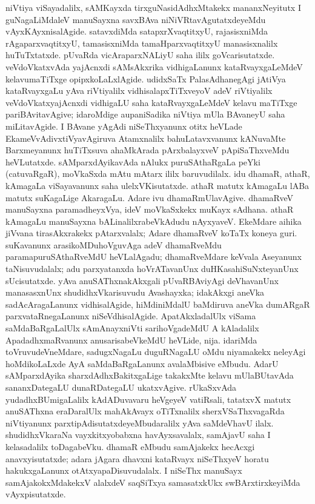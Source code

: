 niVtiya viSayadalilx, sAMKayxda tirxguNasidAdhxMtakekx mananxNeyitutx I guNa\-gaLiMdaleV manuSayxna savxBAva niNiVRtavAgutatxdeyeMdu vAyxKAyxnisalAgide. satavxdiMda satapxrXvaq\-titxyU, rajasisxniMda rAgaparxvaqtitxyU, tamasisxniMda tamaHparxvaqtitxyU manasisxnalilx huTuTx\-tatxde. pUvaRda vicAraparxNALiyU saha ililx goVcarisutatxde. veVdoVkatxvAda yajAcnxdi sAMsAkxrika vidhigaLanunx kataRvayxgaLeMdeV kelavumaTiTxge opipxkoLaLxlAgide. udidxSaTx PalasAdhanegAgi jAtiVya kataRvayxgaLu yAva riVtiyalilx vidhisalapxTiTxveyoV adeV riVtiyalilx veVdoVkatxyajAcnxdi vidhigaLU saha kataRvayxgaLeMdeV kelavu maTiTxge pari\-BAvitavAgive; idaroMdige aupaniSadika niVtiya mUla BAvaneyU saha miLita\-vAgide. I BAvane yAgAdi niSeThxyanunx otitx heVLade EkameVvAdivxtiVyavAgiruva Atamxnalilx bahuLatavxvanunx kANuvaMte Barxmeyanunx huTiTxsuva ahaMkArada pArxbalayxveV pApiSaThxveMdu heVLutatxde. sAMparxdAyikavAda nAlukx puruSAthaRgaLa peYki (catu\-vaRgaR), moVkaSxda mAtu mAtarx ililx baruvudilalx. idu dhamaR, athaR, kAmagaLa viSayavanunx saha ulelxVKisutatxde. athaR matutx kAmagaLu lABa matutx suKagaLige AkaragaLu. Adare ivu dhamaRmUlavAgive. dhamaRveV manuSayxna paramadheyxVya, ideV moVkaSxkekx muKayx sAdhana. athaR kAmagaLu manuSayxna bALinalilxrabeVkAdudu nAyxyaveV. EkeMdare aihika jiVvana tirasAkxrakekx pAtarxvalalx; Adare dhamaRveV koTaTx koneya guri. suKavanunx arasikoMDuhoVguvAga adeV dhamaRveMdu parama\-puruSAthaRveMdU heVLalAgadu; dhamaRveMdare keVvala Aseyanunx taNisuvudalalx; adu parxyatanxda hoVrATavanUnx duHKasahiSuNxteyanUnx sUcisutatxde. yAva anu\-SAThxnakAkxgali pUvaRBAviyAgi deVhavanUnx manasasxnUnx shudidhxVkarisuvudu Avashayxka; idakAkxgi aneVka sadAcAragaLanunx vidhisalAgide, hiMdiniMdalU baMdiruva aneVka dumARgaR parxvataRnegaLanunx niSeVdhisalAgide. ApatAkxladalUlx viSama saMdaBaR\-gaLalUlx sAmAnayxniVti sarihoVgadeMdU A kAladalilx ApadadhxmaRvanunx anusarisa\-beVkeMdU heVLide, nija. idariMda toVruvudeVneMdare, sadugxNagaLu duguRNa\-gaLU oMdu niyamakekx neleyAgi hoMdikoLaLxde AyA saMdaBaRgaLanunx avalaMbi\-sive eMbudu. AdarU sAMparxdAyika sharxdAdhxBakitxgaLige takakxMte kelavu mUla\-BUta\-vAda sananxDategaLU dunaRDategaLU ukatxvAgive. rUkaSxvAda yudadhxBUmigaLalilx kAdADu\-vavaru heVgeyeV vatiRsali, tatatxvX matutx anuSAThxna eraDaralUlx mahAkAvayx oTiTx\-nalilx sherxVSaThxvagaRda niVtiyanunx parxtipAdisutatxdeyeMbudaralilx yAva saMdeVhavU ilalx. shudidhxV\-karaNa vayxkitxyobabxna havAyxsavalalx, samAjavU saha I kelasadalilx toDagabeVku. dhamaR eMbudu samAjakekx hecAcxgi anavxyisutatxde; adara jAgara dhavxni kataRvayx niSeThxyeV horatu hakukxgaLanunx otAtxyapaDisuvudalalx. I niSeThx manuSayx samAjakokxMdakekxV alalxdeV saqSiTxya samasatxkUkx swBArxtirxkeyiMda vAyxpisutatxde.

